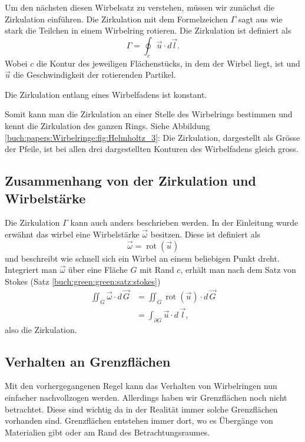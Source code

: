 Um den nächsten diesen Wirbelsatz zu verstehen, müssen wir zunächst die Zirkulation einführen.
Die Zirkulation mit dem Formelzeichen \(\Gamma\) sagt aus wie stark die Teilchen in einem Wirbelring rotieren.
Die Zirkulation ist definiert als 
\[
\Gamma
= 
\oint_{c} \vec{u} \cdot d \vec{l}.
\]
Wobei \(c\) die Kontur des jeweiligen Flächenstücks, in dem der Wirbel liegt, ist und \(\vec{u}\) die Geschwindigkeit der rotierenden Partikel.

\begin{satz}
    \label{buch:wirbelringe:satz:wirbelsatz3}
    Die Zirkulation entlang eines Wirbelfadens ist konstant. 
\end{satz}

Somit kann man die Zirkulation an einer Stelle des Wirbelrings bestimmen und kennt die Zirkulation des ganzen Rings.
Siehe Abbildung \ref{buch:papers:Wirbelringe:fig:Helmholtz_3}: 
Die Zirkulation, dargestellt als Grösse der Pfeile, ist bei allen drei dargestellten Konturen des Wirbelfadens gleich gross.

\subsection{Zusammenhang von der Zirkulation und Wirbelstärke \label{paper:Wirbelringe:Stokes}}

Die Zirkulation \(\Gamma\) kann auch anders beschrieben werden. 
In der Einleitung wurde erwähnt das wirbel eine Wirbelstärke \(\vec{\omega}\) besitzen.
Diese ist definiert als
\[
\vec{\omega}
=
\operatorname{rot}(\vec{u})
\]
und beschreibt wie schnell sich ein Wirbel an einem beliebigen Punkt dreht.
Integriert man \(\vec{\omega}\) über eine Fläche \(G\) mit Rand \(c\), erhält man nach dem Satz von Stokes (Satz \ref{buch:green:green:satz:stokes})
\begin{align*}
\iint_{G} \vec{\omega} \cdot d\, \vec{G}
&=
\iint_{G} \operatorname{rot}(\vec{u})\cdot  d\, \vec{G}\\
&=
\int_{\partial G} \vec{u} \cdot d\,\vec{l},
\end{align*}
also die Zirkulation.

\subsection{Verhalten an Grenzflächen \label{paper:Wirbelringe:Grenzflaechen}}

Mit den vorhergegangenen Regel kann das Verhalten von Wirbelringen nun einfacher nachvollzogen werden.
Allerdings haben wir Grenzflächen noch nicht betrachtet.
Diese sind wichtig da in der Realität immer solche Grenzflächen vorhanden sind.
Grenzflächen entstehen immer dort, wo es Übergänge von Materialien gibt oder am Rand des Betrachtungsraumes.

